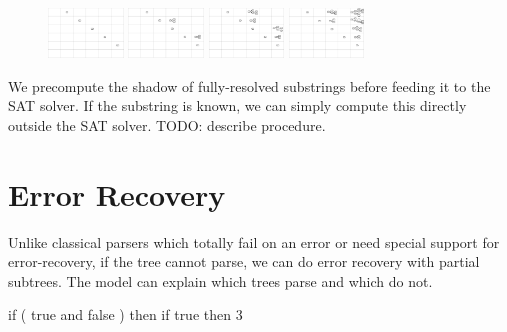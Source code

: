 \documentclass[sigplan,nonacm]{acmart}\settopmatter{printfolios=false,printccs=false,printacmref=false}
\begin{document}
\begin{figure}[H]
    \includegraphics[width=2cm]{../figures/parse1.png}
    \includegraphics[width=2cm]{../figures/parse2.png}
    \includegraphics[width=2cm]{../figures/parse3.png}
    \includegraphics[width=2cm]{../figures/parse4.png}
\end{figure}

We precompute the shadow of fully-resolved substrings before feeding it to the SAT solver. If the substring is known, we can simply compute this directly outside the SAT solver. TODO: describe procedure.

\section{Error Recovery}

Unlike classical parsers which totally fail on an error or need special support for error-recovery, if the tree cannot parse, we can do error recovery with partial subtrees. The model can explain which trees parse and which do not.

\begin{tidyinput}
if ( true and false ) then if true then 3
\end{tidyinput}
\end{document}
